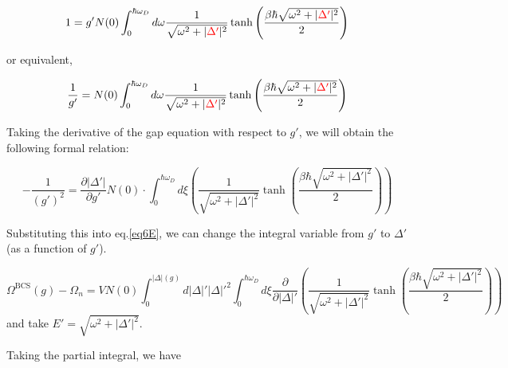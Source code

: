 \[1 = g'N(0)\int_0^{\hbar\omega_D}d\omega\frac{1}{\sqrt{\omega^2+|{\color{red}{\Delta'}}|^2}} \tanh\left(\frac{\beta\hbar\sqrt{\omega^2+|{\color{red}{\Delta'}}|^2} }{2}\right)\]

or equivalent, 

\[\frac{1}{g'} = N(0)\int_0^{\hbar\omega_D}d\omega\frac{1}{\sqrt{\omega^2+|{\color{red}{\Delta'}}|^2}} \tanh\left(\frac{\beta\hbar\sqrt{\omega^2+|{\color{red}{\Delta'}}|^2} }{2}\right)\]

Taking the derivative of the gap equation with respect to $g'$, we will obtain the following formal relation:

\[-\frac{1}{(g')^2} = \frac{\partial|\Delta'|}{\partial g'}N(0)\cdot\int_0^{\hbar\omega_D}d\xi\left(\frac{1}{\sqrt{\omega^2+|{{\Delta'}}|^2}} \tanh\left(\frac{\beta\hbar\sqrt{\omega^2+|{{\Delta'}}|^2} }{2}\right)\right) \]

Substituting this into eq.\eqref{eq6E}, we can change the integral variable from $g'$ to $\Delta'$ (as a function of $g'$). 

\[\Omega^{\text{BCS}}(g) - \Omega_n = VN(0)\int_0^{|\Delta|(g)}d|\Delta|'|\Delta|'^2\int_0^{\hbar\omega_D}d\xi\frac{\partial}{\partial |\Delta|'}\left(\frac{1}{\sqrt{\omega^2+|{{\Delta'}}|^2}} \tanh\left(\frac{\beta\hbar\sqrt{\omega^2+|{{\Delta'}}|^2} }{2}\right)\right) \]
and take $E' = \sqrt{\omega^2+|{{\Delta'}}|^2}$. 

Taking the partial integral, we have

